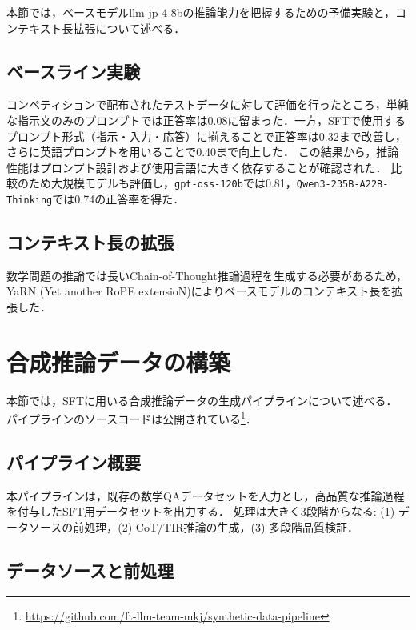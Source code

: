 \documentclass[
  platex, dvipdfmx,  %
]{nlp2026}
\begin{document}
本節では，ベースモデルllm-jp-4-8bの推論能力を把握するための予備実験と，コンテキスト長拡張について述べる．

\subsection{ベースライン実験}

コンペティションで配布されたテストデータに対して評価を行ったところ，単純な指示文のみのプロンプトでは正答率は0.08に留まった．一方，SFTで使用するプロンプト形式（指示・入力・応答）に揃えることで正答率は0.32まで改善し，さらに英語プロンプトを用いることで0.40まで向上した．
この結果から，推論性能はプロンプト設計および使用言語に大きく依存することが確認された．
比較のため大規模モデルも評価し，\texttt{gpt-oss-120b}では0.81，\texttt{Qwen3-235B-A22B-Thinking}では0.74の正答率を得た．

\subsection{コンテキスト長の拡張}

数学問題の推論では長いChain-of-Thought推論過程を生成する必要があるため，YaRN (Yet another RoPE extensioN)\cite{yarn}によりベースモデルのコンテキスト長を拡張した．


\section{合成推論データの構築}
\label{sec:synth}

本節では，SFTに用いる合成推論データの生成パイプラインについて述べる．
パイプラインのソースコードは公開されている\footnote{\url{https://github.com/ft-llm-team-mkj/synthetic-data-pipeline}}．

\subsection{パイプライン概要}

本パイプラインは，既存の数学QAデータセットを入力とし，高品質な推論過程を付与したSFT用データセットを出力する．
処理は大きく3段階からなる: (1) データソースの前処理，(2) CoT/TIR推論の生成，(3) 多段階品質検証．

\subsection{データソースと前処理}
\end{document}
